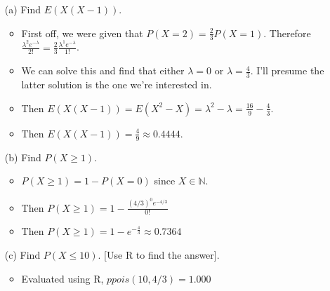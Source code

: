 \documentclass{article}
\begin{document}
\begin{enumerate}
    \begin{enumerate}
    \item [(a)] Find $E(X(X-1))$.
        \begin{itemize}
        \item First off, we were given that $P(X=2)=\frac{2}{3}P(X=1)$. Therefore $\frac{\lambda^2 e^{-\lambda}}{2!}=\frac{2}{3}\frac{\lambda^1 e^{-\lambda}}{1!}$.
        \item We can solve this and find that either $\lambda = 0$ or $\lambda = \frac{4}{3}$. I'll presume the latter solution is the one we're interested in.
        \item Then $E(X(X-1)) = E(X^2 - X) = \lambda^2 - \lambda = \frac{16}{9} - \frac{4}{3}$.
        \item Then $E(X(X-1)) = \frac{4}{9} \approx 0.4444$.
        \end{itemize}
    \item [(b)] Find $P(X \ge 1)$.
        \begin{itemize}
        \item $P(X \ge 1) = 1 - P(X = 0)$ since $X \in \mathbb{N}$.
        \item Then $P(X \ge 1) = 1 - \frac{(4/3)^0 e^{-4/3}}{0!}$
        \item Then $P(X \ge 1) = 1 - e^{-\frac{4}{3}} \approx 0.7364$
        \end{itemize}
    \item [(c)] Find $P(X \le 10)$. [Use R to find the answer].
        \begin{itemize}
        \item Evaluated using R, $ppois(10, 4/3) = 1.000$
        \end{itemize}
    \end{enumerate}


\end{enumerate}
\end{document}
